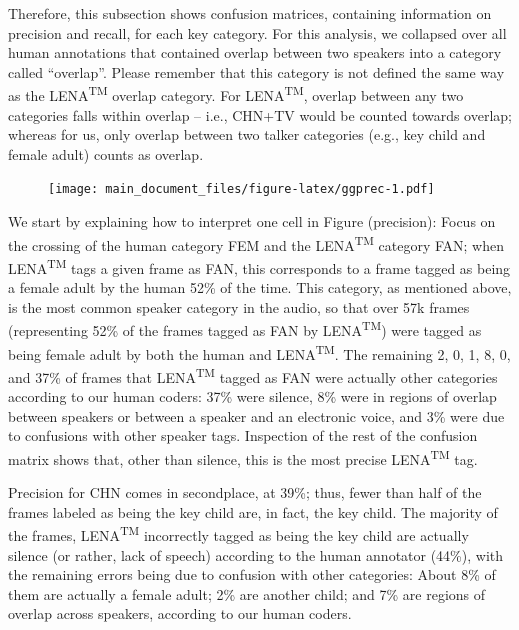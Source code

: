 \documentclass[english,floatsintext,man]{apa6}
\begin{document}
Therefore, this subsection shows confusion matrices, containing
information on precision and recall, for each key category. For this
analysis, we collapsed over all human annotations that contained overlap
between two speakers into a category called \enquote{overlap}. Please
remember that this category is not defined the same way as the
LENA\textsuperscript{TM} overlap category. For LENA\textsuperscript{TM},
overlap between any two categories falls within overlap -- i.e., CHN+TV
would be counted towards overlap; whereas for us, only overlap between
two talker categories (e.g., key child and female adult) counts as
overlap.

\begin{figure}
\centering
\texttt{[image: main\_document\_files/figure-latex/ggprec-1.pdf]}
\caption{}
\end{figure}

We start by explaining how to interpret one cell in Figure (precision):
Focus on the crossing of the human category FEM and the
LENA\textsuperscript{TM} category FAN; when LENA\textsuperscript{TM}
tags a given frame as FAN, this corresponds to a frame tagged as being a
female adult by the human 52\% of the time. This category, as mentioned
above, is the most common speaker category in the audio, so that over
57k frames (representing 52\% of the frames tagged as FAN by
LENA\textsuperscript{TM}) were tagged as being female adult by both the
human and LENA\textsuperscript{TM}. The remaining 2, 0, 1, 8, 0, and
37\% of frames that LENA\textsuperscript{TM} tagged as FAN were actually
other categories according to our human coders: 37\% were silence, 8\%
were in regions of overlap between speakers or between a speaker and an
electronic voice, and 3\% were due to confusions with other speaker
tags. Inspection of the rest of the confusion matrix shows that, other
than silence, this is the most precise LENA\textsuperscript{TM} tag.

Precision for CHN comes in secondplace, at 39\%; thus, fewer than half
of the frames labeled as being the key child are, in fact, the key
child. The majority of the frames, LENA\textsuperscript{TM} incorrectly
tagged as being the key child are actually silence (or rather, lack of
speech) according to the human annotator (44\%), with the remaining
errors being due to confusion with other categories: About 8\% of them
are actually a female adult; 2\% are another child; and 7\% are regions
of overlap across speakers, according to our human coders.
\end{document}
